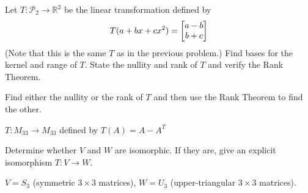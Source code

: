 \documentclass[boxes]{gsypset}
\begin{document}
	\begin{problem}[6.5.7]
		Let $T: \mathscr{P}_2 \to \mathbb{R}^2$ be the linear transformation defined by
		\[
			T(a + bx + cx^2) = \begin{bmatrix}a-b\\b+c\end{bmatrix}
		\]
		(Note that this is the same $T$ as in the previous problem.)
		Find bases for the kernel and range of $T$.
		State the nullity and rank of $T$ and verify the Rank Theorem.
	\end{problem}
	\begin{solution}
		
	\end{solution}
	
	\begin{problem}[6.5.14]
		Find either the nullity or the rank of $T$ and then use the Rank Theorem to find the other.
		
		$T: M_{33} \to M_{33}$ defined by $T(A) = A - A^T$
	\end{problem}
	\begin{solution}
		
	\end{solution}
	
	\begin{problem}[6.5.22]
		Determine whether $V$ and $W$ are isomorphic. 
		If they are, give an explicit isomorphism $T: V \to W$.
		
		$V = S_3$ (symmetric $3\times3$ matrices),
		$W = U_3$ (upper-triangular $3\times3$ matrices).
	\end{problem}
	\begin{solution}
		
	\end{solution}
\end{document}
